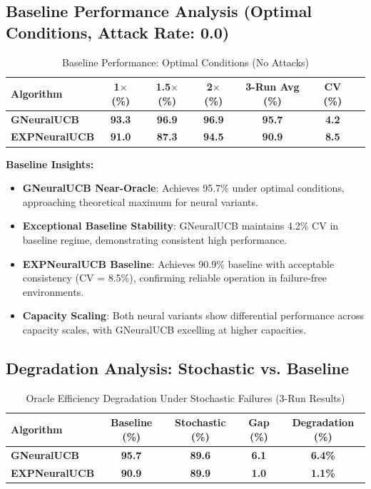\documentclass[12pt,a4paper]{article}
\newcommand{\success}[1]{\textcolor{accentgreen}{\textbf{#1}}}
\newcommand{\legacy}[1]{\textcolor{legacycolor}{\textbf{#1}}}
\newcommand{\neural}[1]{\textcolor{neuralcolor}{\textbf{#1}}}
\begin{document}
\subsection{Baseline Performance Analysis (Optimal Conditions, Attack Rate: 0.0)}

\begin{table}[H]
\centering
\caption{Baseline Performance: Optimal Conditions (No Attacks)}
\label{tab:baseline-performance}
\begin{tabular}{@{}lcccccc@{}}
\toprule
\textbf{Algorithm} & \textbf{1$\times$ (\%)} & \textbf{1.5$\times$ (\%)} & \textbf{2$\times$ (\%)} & \textbf{3-Run Avg (\%)} & \textbf{CV (\%)} \\
\midrule
\neural{GNeuralUCB}            & \neural{93.3} & \neural{96.9} & \neural{96.9} & \neural{95.7} & \neural{4.2} \\
\legacy{EXPNeuralUCB}           & \legacy{91.0} & \legacy{87.3} & \legacy{94.5} & \legacy{90.9} & \legacy{8.5} \\
\bottomrule
\end{tabular}
\end{table}

\textbf{Baseline Insights:}
\begin{itemize}
\item \neural{GNeuralUCB Near-Oracle}: Achieves 95.7\% under optimal conditions, approaching theoretical maximum for neural variants.
\item \neural{Exceptional Baseline Stability}: GNeuralUCB maintains 4.2\% CV in baseline regime, demonstrating consistent high performance.
\item \legacy{EXPNeuralUCB Baseline}: Achieves 90.9\% baseline with acceptable consistency (CV = 8.5\%), confirming reliable operation in failure-free environments.
\item \success{Capacity Scaling}: Both neural variants show differential performance across capacity scales, with GNeuralUCB excelling at higher capacities.
\end{itemize}

\subsection{Degradation Analysis: Stochastic vs. Baseline}

\begin{table}[H]
\centering
\caption{Oracle Efficiency Degradation Under Stochastic Failures (3-Run Results)}
\label{tab:degradation-analysis}
\begin{tabular}{@{}lcccc@{}}
\toprule
\textbf{Algorithm} & \textbf{Baseline (\%)} & \textbf{Stochastic (\%)} & \textbf{Gap (\%)} & \textbf{Degradation (\%)} \\
\midrule
\neural{GNeuralUCB}            & \neural{95.7} & \neural{89.6} & \neural{6.1} & \neural{6.4\%} \\
\legacy{EXPNeuralUCB}           & \legacy{90.9} & \legacy{89.9} & \legacy{1.0} & \legacy{1.1\%} \\
\bottomrule
\end{tabular}
\end{table}
\end{document}
